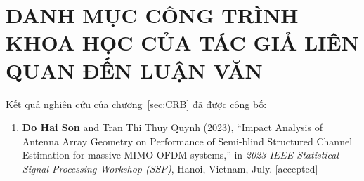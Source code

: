 \clearpage
{}

\chapter*{DANH MỤC CÔNG TRÌNH KHOA HỌC CỦA TÁC GIẢ LIÊN QUAN ĐẾN LUẬN VĂN}

Kết quả nghiên cứu của chương~\ref{sec:CRB} đã được công bố:
\begin{enumerate}
    \item[] \textbf{Do Hai Son} and Tran Thi Thuy Quynh (2023), ``Impact Analysis of Antenna Array Geometry on Performance of Semi-blind Structured Channel Estimation for massive MIMO-OFDM systems,'' in \textit{2023 IEEE Statistical Signal Processing Workshop (SSP)}, Hanoi, Vietnam, July. [accepted]
\end{enumerate}